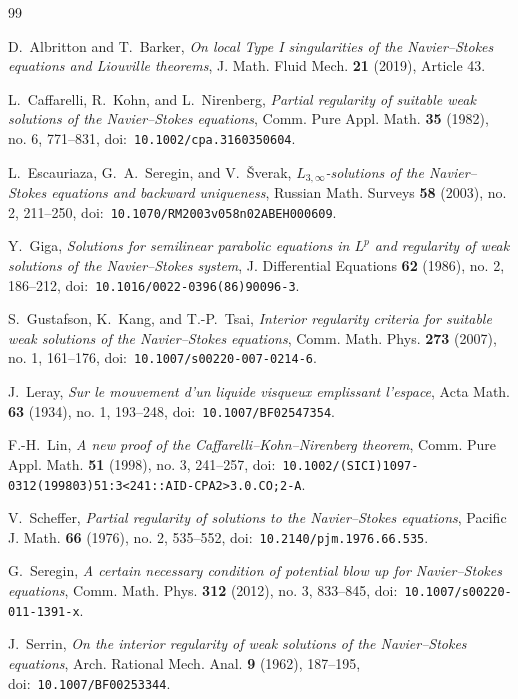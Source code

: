 \documentclass[11pt]{amsart}
\theoremstyle{plain}
\theoremstyle{definition}
\theoremstyle{remark}
\numberwithin{equation}{section}
\begin{document}
\clearpage
\begin{thebibliography}{99}

D.~Albritton and T.~Barker,
\emph{On local Type I singularities of the Navier--Stokes equations and
Liouville theorems},
J. Math. Fluid Mech. \textbf{21} (2019), Article 43.

L.~Caffarelli, R.~Kohn, and L.~Nirenberg,
\emph{Partial regularity of suitable weak solutions of the Navier--Stokes
 equations},
Comm. Pure Appl. Math. \textbf{35} (1982), no. 6, 771--831,
doi:\ \nolinkurl{10.1002/cpa.3160350604}.

L.~Escauriaza, G.~A.~Seregin, and V.~{\v S}verak,
\emph{\(L_{3,\infty}\)-solutions of the Navier--Stokes equations and
 backward uniqueness},
Russian Math. Surveys \textbf{58} (2003), no. 2, 211--250,
doi:\ \nolinkurl{10.1070/RM2003v058n02ABEH000609}.

Y.~Giga,
\emph{Solutions for semilinear parabolic equations in \(L^p\) and regularity
 of weak solutions of the Navier--Stokes system},
J. Differential Equations \textbf{62} (1986), no. 2, 186--212,
doi:\ \nolinkurl{10.1016/0022-0396(86)90096-3}.

S.~Gustafson, K.~Kang, and T.-P.~Tsai,
\emph{Interior regularity criteria for suitable weak solutions of the
 Navier--Stokes equations},
Comm. Math. Phys. \textbf{273} (2007), no. 1, 161--176,
doi:\ \nolinkurl{10.1007/s00220-007-0214-6}.

J.~Leray,
\emph{Sur le mouvement d'un liquide visqueux emplissant l'espace},
Acta Math. \textbf{63} (1934), no. 1, 193--248,
doi:\ \nolinkurl{10.1007/BF02547354}.

F.-H.~Lin,
\emph{A new proof of the Caffarelli--Kohn--Nirenberg theorem},
Comm. Pure Appl. Math. \textbf{51} (1998), no. 3, 241--257,
doi:\ \nolinkurl{10.1002/(SICI)1097-0312(199803)51:3<241::AID-CPA2>3.0.CO;2-A}.

V.~Scheffer,
\emph{Partial regularity of solutions to the Navier--Stokes equations},
Pacific J. Math. \textbf{66} (1976), no. 2, 535--552,
doi:\ \nolinkurl{10.2140/pjm.1976.66.535}.

G.~Seregin,
\emph{A certain necessary condition of potential blow up for Navier--Stokes
 equations},
Comm. Math. Phys. \textbf{312} (2012), no. 3, 833--845,
doi:\ \nolinkurl{10.1007/s00220-011-1391-x}.

J.~Serrin,
\emph{On the interior regularity of weak solutions of the Navier--Stokes
 equations},
Arch. Rational Mech. Anal. \textbf{9} (1962), 187--195,
doi:\ \nolinkurl{10.1007/BF00253344}.


\end{thebibliography}
\end{document}
